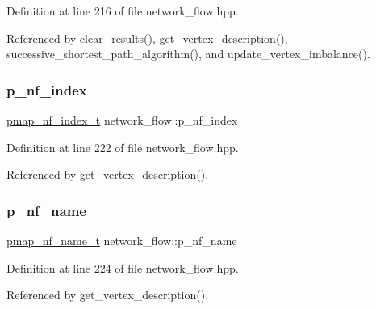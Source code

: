 Definition at line 216 of file network\+\_\+flow.\+hpp.



Referenced by clear\+\_\+results(), get\+\_\+vertex\+\_\+description(), successive\+\_\+shortest\+\_\+path\+\_\+algorithm(), and update\+\_\+vertex\+\_\+imbalance().

\mbox{\label{classnetwork__flow_a26b0c291ee60a72f13348727b307f226}} 
\subsubsection{\texorpdfstring{p\+\_\+nf\+\_\+index}{p\_nf\_index}}
{\footnotesize\ttfamily \hyperlink{classnetwork__flow_a8f87f8e2ed2e6d081d66eba9ea1b284c}{pmap\+\_\+nf\+\_\+index\+\_\+t} network\+\_\+flow\+::p\+\_\+nf\+\_\+index}



Definition at line 222 of file network\+\_\+flow.\+hpp.



Referenced by get\+\_\+vertex\+\_\+description().

\mbox{\label{classnetwork__flow_a82b6c4f79a4b71847e183dd0d119dbcb}} 
\subsubsection{\texorpdfstring{p\+\_\+nf\+\_\+name}{p\_nf\_name}}
{\footnotesize\ttfamily \hyperlink{classnetwork__flow_a86d192070fc0f9d58337b45c30855c6f}{pmap\+\_\+nf\+\_\+name\+\_\+t} network\+\_\+flow\+::p\+\_\+nf\+\_\+name}



Definition at line 224 of file network\+\_\+flow.\+hpp.



Referenced by get\+\_\+vertex\+\_\+description().

\mbox{\label{classnetwork__flow_aaa333405d94f8f54981e5788d9530e8a}} 
